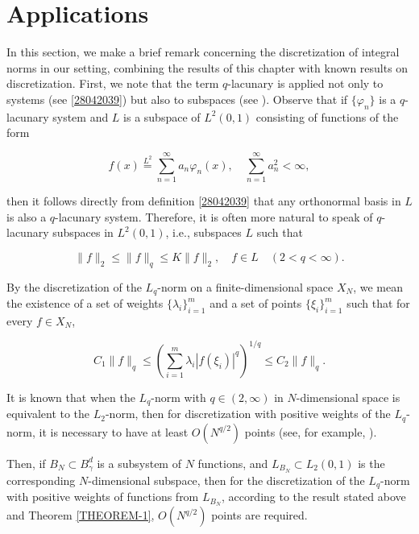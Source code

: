 \documentclass[12pt]{article}
\begin{document}
	
	\section{Applications} \label{section-4}
	In this section, we make a brief remark concerning the discretization of integral norms in our setting, combining the results of this chapter with known results on discretization. First, we note that the term $q$-lacunary is applied not only to systems (see \eqref{28042039}) but also to subspaces (see \cite[Ch. 9, \S 4]{Kashin-Saakyan-1999}). Observe that if $\{\varphi_n\}$ is a $q$-lacunary system and $L$ is a subspace of $L^2(0, 1)$ consisting of functions of the form
	
	\[
	f(x) \stackrel{L^2}{=} \sum_{n=1}^{\infty} a_n \varphi_n(x), \quad \sum_{n=1}^{\infty} a_n^2 < \infty,
	\]
	
	then it follows directly from definition \eqref{28042039} that any orthonormal basis in $L$ is also a $q$-lacunary system. Therefore, it is often more natural to speak of $q$-lacunary subspaces in $L^2(0, 1)$, i.e., subspaces $L$ such that
	
	\[
	\|f\|_2 \leqslant \|f\|_q \leqslant K \|f\|_2, \quad f \in L \quad (2 < q < \infty).
	\]
	
	By the discretization of the $L_q$-norm on a finite-dimensional space $X_N$, we mean the existence of a set of weights $\{\lambda_i\}_{i=1}^{m}$ and a set of points $\{\xi_i\}_{i=1}^{m}$ such that for every $f \in X_N$,
	
	\[
	C_1\|f\|_q \le \left(\sum_{i=1}^{m}\lambda_i|f(\xi_i)|^{q} \right)^{1/q} \le C_2\|f\|_q.
	\]
	
	It is known that when the $L_q$-norm with $q \in (2,\infty)$ in $N$-dimensional space
	is equivalent to the $L_2$-norm, then for discretization with positive weights of the $L_q$-norm, it is necessary to have at least $O(N^{q / 2})$ points (see, for example, \cite[(D.20)]{Kashin-2022}).
	
	Then, if $B_N \subset B_{\gamma}^d$ is a subsystem of $N$ functions, and $L_{B_N} \subset L_2(0,1)$ is the corresponding $N$-dimensional subspace, then for the discretization of the $L_q$-norm with positive weights of functions from $L_{B_N}$, according to the result stated above and Theorem \ref{THEOREM-1}, $O(N^{q / 2})$ points are required.
	
\end{document}
